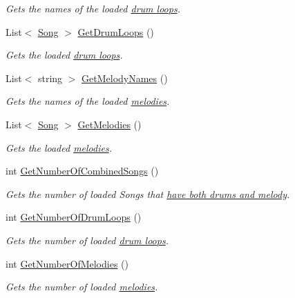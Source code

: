 \begin{DoxyCompactItemize}
\begin{DoxyCompactList}\small\item\em Gets the names of the loaded \hyperlink{group___song_group_DocSongDrumLoop}{drum loops}. \end{DoxyCompactList}\item 
List$<$ \hyperlink{class_song}{Song} $>$ \hyperlink{group___s_m_pub_func_ga354a675f296f9a733ad6d76fea7429dd}{Get\+Drum\+Loops} ()
\begin{DoxyCompactList}\small\item\em Gets the loaded \hyperlink{group___song_group_DocSongDrumLoop}{drum loops}. \end{DoxyCompactList}\item 
List$<$ string $>$ \hyperlink{group___s_m_pub_func_ga59df8468ac771fc8eb1a5f2025e6c5a8}{Get\+Melody\+Names} ()
\begin{DoxyCompactList}\small\item\em Gets the names of the loaded \hyperlink{group___song_group_DocSongMelody}{melodies}. \end{DoxyCompactList}\item 
List$<$ \hyperlink{class_song}{Song} $>$ \hyperlink{group___s_m_pub_func_ga7d46ab1949725dd7c3c00ac3975916fe}{Get\+Melodies} ()
\begin{DoxyCompactList}\small\item\em Gets the loaded \hyperlink{group___song_group_DocSongMelody}{melodies}. \end{DoxyCompactList}\item 
int \hyperlink{group___s_m_pub_func_gac41e94dbaa3f2db83a6d86466526f76c}{Get\+Number\+Of\+Combined\+Songs} ()
\begin{DoxyCompactList}\small\item\em Gets the number of loaded Songs that \hyperlink{group___song_group_DocSongCombined}{have both drums and melody}. \end{DoxyCompactList}\item 
int \hyperlink{group___s_m_pub_func_ga97d32492e08ca62787088888e78589b7}{Get\+Number\+Of\+Drum\+Loops} ()
\begin{DoxyCompactList}\small\item\em Gets the number of loaded \hyperlink{group___song_group_DocSongDrumLoop}{drum loops}. \end{DoxyCompactList}\item 
int \hyperlink{group___s_m_pub_func_gae1d2222909f1d9a1f761591c7154f42c}{Get\+Number\+Of\+Melodies} ()
\begin{DoxyCompactList}\small\item\em Gets the number of loaded \hyperlink{group___song_group_DocSongMelody}{melodies}. \end{DoxyCompactList}\item 

\end{DoxyCompactItemize}
